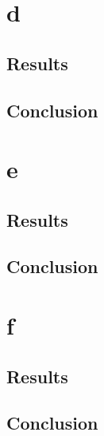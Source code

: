 \documentclass{article}
\begin{document}
\section{d}
\subsection{Results}
\subsection{Conclusion}
\section{e}
\subsection{Results}
\subsection{Conclusion}
\section{f}
\subsection{Results}
\subsection{Conclusion}
\end{document}
